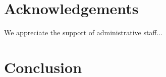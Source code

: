 \section{Acknowledgements}

We appreciate the support of administrative staff...

\section{Conclusion}



